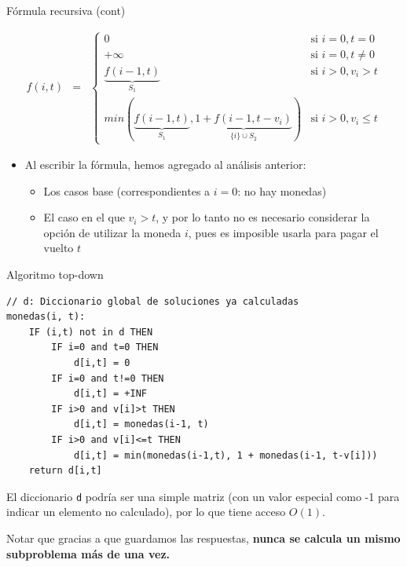 \documentclass{beamer}
\begin{document}
\begin{frame}{Fórmula recursiva (cont)}

    $$\begin{array}{rcl} f(i,t) & = & \left \{ \begin{array}{cl} 0 & \mbox{si } i = 0, t = 0 \\ +\infty & \mbox{si } i = 0, t \neq 0 \\ \underbrace{f(i-1,t)}_{S_1} & \mbox{si } i > 0, v_i > t \\ min \left (\underbrace{f(i-1,t)}_{S_1}, \underbrace{1 + f(i-1, t- v_i)}_{\{i\} \cup S_2} \right ) & \mbox{si } i > 0, v_i \leq t \end{array} \right . \end{array} $$ 
\begin{itemize}
    \item Al escribir la fórmula, hemos agregado al análisis anterior:
        \begin{itemize}
            \item Los casos base (correspondientes a $i=0$: no hay monedas)
            \item El caso en el que $v_i > t$, y por lo tanto no es necesario considerar la opción de utilizar la moneda $i$, pues es imposible usarla para pagar el vuelto $t$ 
        \end{itemize}
\end{itemize}    
\end{frame}

\begin{frame}[fragile]{Algoritmo top-down}
\begin{lstlisting}
// d: Diccionario global de soluciones ya calculadas
monedas(i, t):
    IF (i,t) not in d THEN
        IF i=0 and t=0 THEN
            d[i,t] = 0
        IF i=0 and t!=0 THEN
            d[i,t] = +INF
        IF i>0 and v[i]>t THEN
            d[i,t] = monedas(i-1, t)
        IF i>0 and v[i]<=t THEN
            d[i,t] = min(monedas(i-1,t), 1 + monedas(i-1, t-v[i]))
    return d[i,t]
\end{lstlisting}

El diccionario \texttt{d} podría ser una simple matriz (con un valor especial como -1 para indicar un elemento no calculado), por lo que tiene acceso $O(1)$.

Notar que gracias a que guardamos las respuestas, \textbf{nunca se calcula un mismo subproblema más de una vez.}
\end{frame}
\end{document}
